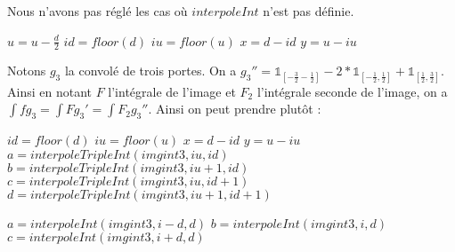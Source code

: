 Nous n'avons pas réglé les cas où $interpoleInt$ n'est pas définie.

\begin{algorithm}[H]
\caption{$interpole(imgint,u,d)$}
$u=u-\frac{d}{2}$\;
$id=floor(d)$\;
$iu=floor(u)$\;
$x = d-id$\;
$y = u-iu$\;
\end{algorithm}

\begin{algorithm}[H]
\caption{$interpoleInt(imgint,i,d)$}
\end{algorithm}



Notons $g_3$ la convolé de trois portes. On a $g_3'' = \mathds{1}_{[-\frac{3}{2} -\frac{1}{2}]}-2*\mathds{1}_{[-\frac{1}{2},\frac{1}{2}]}+\mathds{1}_{[\frac{1}{2},\frac{3}{2}]}$.
Ainsi en notant $F$ l'intégrale de l'image et $F_2$ l'intégrale seconde de l'image, on a $\int f g_3 = \int F g_3' = \int F_2 g_3''$.
Ainsi on peut prendre plutôt : 

\begin{algorithm}[H]
\caption{$interpole3(imgint3,u,d)$}
$id=floor(d)$\;
$iu=floor(u)$\;
$x = d-id$\;
$y = u-iu$\;
$a=interpoleTripleInt(imgint3,iu,id)$\;
$b=interpoleTripleInt(imgint3,iu+1,id)$\;
$c=interpoleTripleInt(imgint3,iu,id+1)$\;
$d=interpoleTripleInt(imgint3,iu+1,id+1)$\;
\end{algorithm}

\begin{algorithm}[H]
\caption{$interpoleTripleInt(imgint3,i,d)$}
$a=interpoleInt(imgint3,i-d,d)$\;
$b=interpoleInt(imgint3,i,d)$\;
$c=interpoleInt(imgint3,i+d,d)$\;
\end{algorithm}

